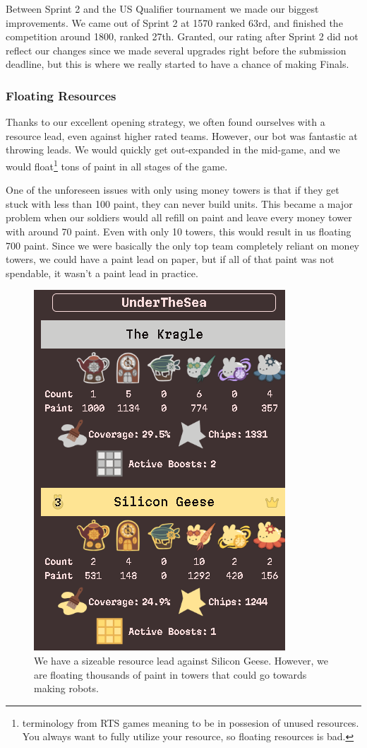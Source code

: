 Between Sprint 2 and the US Qualifier tournament we made our biggest improvements. We came out of Sprint 2 at 1570 ranked 63rd, and finished the competition around 1800, ranked 27th. Granted, our rating after Sprint 2 did not reflect our changes since we made several upgrades right before the submission deadline, but this is where we really started to have a chance of making Finals.

\subsubsection{Floating Resources}

Thanks to our excellent opening strategy, we often found ourselves with a resource lead, even against higher rated teams. However, our bot was fantastic at throwing leads. We would quickly get out-expanded in the mid-game, and we would float\footnote{terminology from RTS games meaning to be in possesion of unused resources. You always want to fully utilize your resource, so floating resources is bad.} tons of paint in all stages of the game.

\medskip

One of the unforeseen issues with only using money towers is that if they get stuck with less than 100 paint, they can never build units. This became a major problem when our soldiers would all refill on paint and leave every money tower with around 70 paint. Even with only 10 towers, this would result in us floating 700 paint. Since we were basically the only top team completely reliant on money towers, we could have a paint lead on paper, but if all of that paint was not spendable, it wasn't a paint lead in practice.

\begin{figure}[H]
    \centering
    \includegraphics[scale=0.5]{images/floating_resources.png}
    \caption{We have a sizeable resource lead against Silicon Geese. However, we are floating thousands of paint in towers that could go towards making robots.}
\end{figure}

